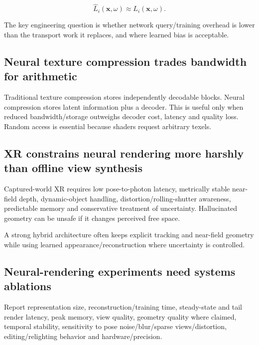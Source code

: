 \[
\hat L_i(\mathbf x,\omega)\approx L_i(\mathbf x,\omega).
\]

The key engineering question is whether network query/training overhead is lower than the transport work it replaces, and where learned bias is acceptable.

\subsection{Neural texture compression trades bandwidth for arithmetic}\label{04-visual-computing-ii-ch035-neural-texture-compression-trades-bandwidth-for-arithmetic}

Traditional texture compression stores independently decodable blocks. Neural compression stores latent information plus a decoder. This is useful only when reduced bandwidth/storage outweighs decoder cost, latency and quality loss. Random access is essential because shaders request arbitrary texels.

\subsection{XR constrains neural rendering more harshly than offline view synthesis}\label{04-visual-computing-ii-ch035-xr-constrains-neural-rendering-more-harshly-than-offline-view-synthesis}

Captured-world XR requires low pose-to-photon latency, metrically stable near-field depth, dynamic-object handling, distortion/rolling-shutter awareness, predictable memory and conservative treatment of uncertainty. Hallucinated geometry can be unsafe if it changes perceived free space.

A strong hybrid architecture often keeps explicit tracking and near-field geometry while using learned appearance/reconstruction where uncertainty is controlled.

\subsection{Neural-rendering experiments need systems ablations}\label{04-visual-computing-ii-ch035-neural-rendering-experiments-need-systems-ablations}

Report representation size, reconstruction/training time, steady-state and tail render latency, peak memory, view quality, geometry quality where claimed, temporal stability, sensitivity to pose noise/blur/sparse views/distortion, editing/relighting behavior and hardware/precision.

